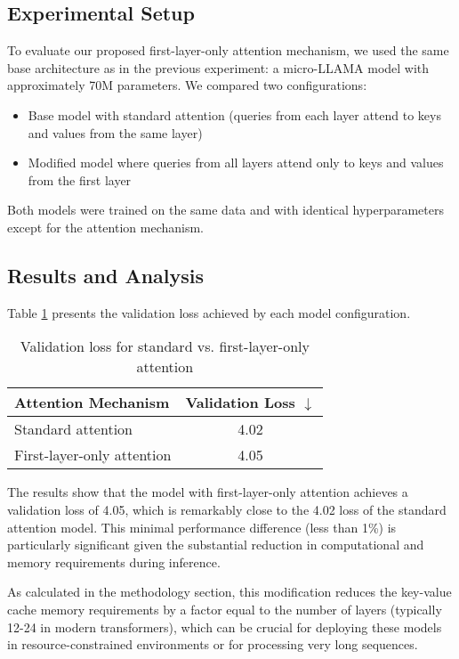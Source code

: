 \subsection{Experimental Setup}

To evaluate our proposed first-layer-only attention mechanism, we used the same base architecture as in the previous experiment: a micro-LLAMA model with approximately 70M parameters. We compared two configurations:

\begin{itemize}
    \item Base model with standard attention (queries from each layer attend to keys and values from the same layer)
    \item Modified model where queries from all layers attend only to keys and values from the first layer
\end{itemize}

Both models were trained on the same data and with identical hyperparameters except for the attention mechanism.

\subsection{Results and Analysis}

Table \ref{tab:first_layer_attention_results} presents the validation loss achieved by each model configuration.

\begin{table}[h]
    \centering
    \caption{Validation loss for standard vs. first-layer-only attention}
    \begin{tabular}{lc}
    \toprule
    Attention Mechanism & Validation Loss $\downarrow$ \\
    \midrule
    Standard attention & 4.02 \\
    First-layer-only attention & 4.05 \\
    \bottomrule
    \end{tabular}
    \label{tab:first_layer_attention_results}
\end{table}

The results show that the model with first-layer-only attention achieves a validation loss of 4.05, which is remarkably close to the 4.02 loss of the standard attention model. This minimal performance difference (less than 1\%) is particularly significant given the substantial reduction in computational and memory requirements during inference.

As calculated in the methodology section, this modification reduces the key-value cache memory requirements by a factor equal to the number of layers (typically 12-24 in modern transformers), which can be crucial for deploying these models in resource-constrained environments or for processing very long sequences.

